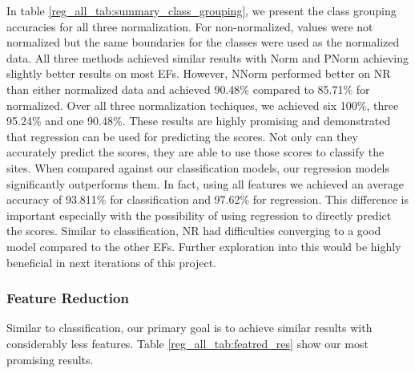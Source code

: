 \documentclass[12pt,letterpaper]{article}
\begin{document}
In table \ref{reg_all_tab:summary_class_grouping}, we present the class grouping accuracies for all three normalization.
For non-normalized, values were not normalized but the same boundaries for the classes were used as the normalized data.
All three methods achieved similar results with Norm and PNorm achieving slightly better results on most \ac{EF}s.
However, NNorm performed better on \ac{NR} than either normalized data and achieved 90.48\% compared to 85.71\% for normalized.
Over all three normalization techiques, we achieved six 100\%, three 95.24\% and one 90.48\%.
These results are highly promising and demonstrated that regression can be used for predicting the scores.
Not only can they accurately predict the scores, they are able to use those scores to classify the sites.
When compared against our classification models, our regression models significantly outperforms them.
In fact, using all features we achieved an average accuracy of 93.811\% for classification and 97.62\% for regression.  
This difference is important especially with the possibility of using regression to directly predict the scores. 
Similar to classification, \ac{NR} had difficulties converging to a good model compared to the other \ac{EF}s.
Further exploration into this would be highly beneficial in next iterations of this project.

\subsubsection{Feature Reduction}
Similar to classification, our primary goal is to achieve similar results with considerably less features.
Table \ref{reg_all_tab:featred_res} show our most promising results.
\end{document}
